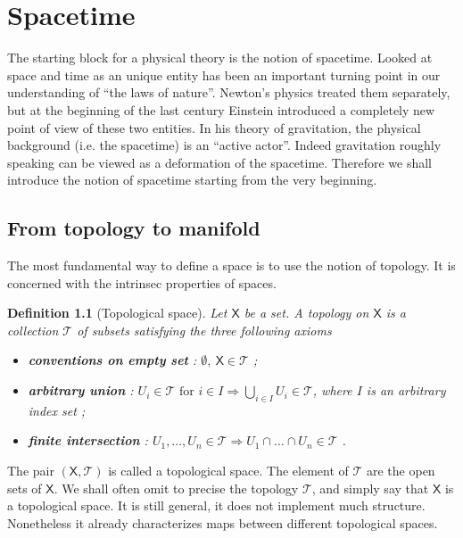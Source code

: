 \documentclass[10pt]{book}
\newcommand{\Tcal}{\mathcal{T}}
\newcommand{\Xsf}{\mathsf{X}}
\theoremstyle{break}
\newtheorem{definition}{Definition}
\begin{document}
\chapter{Spacetime}


The starting block for a physical theory is the notion of spacetime. Looked at space and time as an unique entity has been an important turning point in our understanding of ``the laws of nature''. Newton's physics treated them separately, but at the beginning of the last century Einstein introduced a completely new point of view of these two entities. In his theory of gravitation, the physical background (i.e. the spacetime) is an ``active actor''. Indeed gravitation roughly speaking can be viewed as a deformation of the spacetime. Therefore we shall introduce the notion of spacetime starting from the very beginning.


\section{From topology to manifold}

The most fundamental way to define a space is to use the notion of topology. It is concerned with the intrinsec properties of spaces.

\begin{definition}[Topological space] 
Let $\Xsf$ be a set. A topology on $\Xsf$ is a collection $\Tcal$ of subsets satisfying the three following axioms%
%
\begin{itemize}
\item \textbf{conventions on empty set} : $\emptyset , \ \Xsf \in \Tcal$ ;
\item \textbf{arbitrary union} : $U_i \in \Tcal \mbox{ for } i \in I \Longrightarrow \bigcup_{i\in I} U_i \in \Tcal$, where $I$ is an arbitrary index set ;
\item \textbf{finite intersection} : $U_1 , \dots , U_n \in \Tcal \Longrightarrow U_1 \cap \dots \cap U_n \in \Tcal$ .
\end{itemize}
%
\end{definition}


The pair $(\Xsf,\Tcal)$ is called a topological space. The element of $\Tcal$ are the open sets of $\Xsf$. We shall often omit to precise the topology $\Tcal$, and simply say that $\Xsf$ is a topological space. It is still general, it does not implement much structure. Nonetheless it already characterizes maps between different topological spaces.\par%
\end{document}
